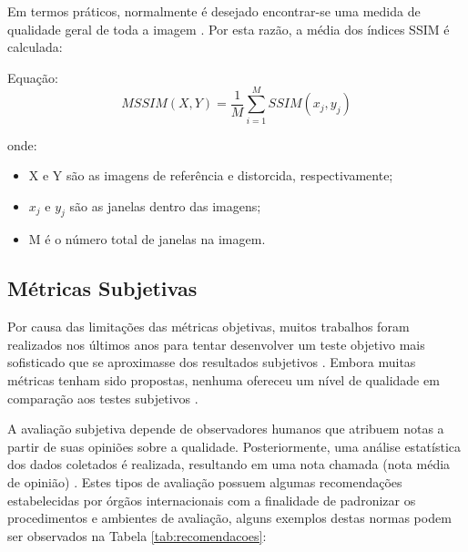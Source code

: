 Em termos práticos, normalmente é desejado encontrar-se uma medida de qualidade geral de toda a imagem \cite{wangbovik2004}. Por esta razão, a média dos índices SSIM é calculada:

Equação: \[MSSIM(X, Y) = \frac{1}{M} \sum_{i=1}^{M} SSIM(x_{j}, y_{j})\]

onde:
\begin{itemize}
	\item X e Y são as imagens de referência e distorcida, respectivamente;
	\item \(x_{j}\) e \(y_{j}\) são as janelas dentro das imagens;
	\item M é o número total de janelas na imagem.
\end{itemize}

\subsection{Métricas Subjetivas}

Por causa das limitações das métricas objetivas, muitos trabalhos foram realizados nos últimos anos para tentar desenvolver um teste objetivo mais sofisticado que se aproximasse dos resultados subjetivos \cite{watson1999, wangbovik2004}. Embora muitas métricas tenham sido propostas, nenhuma ofereceu um nível de qualidade em comparação aos testes subjetivos \cite{vqeg2003}.

A avaliação subjetiva depende de observadores humanos que atribuem notas a partir de suas opiniões sobre a qualidade. Posteriormente, uma análise estatística dos dados coletados é realizada, resultando em uma nota chamada  (nota média de opinião) \cite{itup930} \cite{albini}. Estes tipos de avaliação possuem algumas recomendações estabelecidas por órgãos internacionais com a finalidade de padronizar os procedimentos e ambientes de avaliação, alguns exemplos destas normas podem ser observados na Tabela \ref{tab:recomendacoes}:

